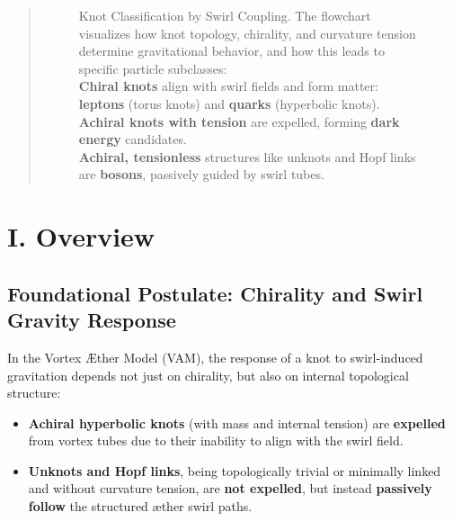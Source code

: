 \documentclass[12pt]{article}
\begin{document}
\begin{abstract}
\begin{figure}[H]
{
            }
            \caption{Knot Classification by Swirl Coupling.
                The flowchart visualizes how knot topology, chirality, and curvature tension determine gravitational behavior, and how this leads to specific particle subclasses:
                    \\ \textbf{Chiral knots} align with swirl fields and form matter: \textbf{leptons} (torus knots) and \textbf{quarks} (hyperbolic knots).
                    \\ \textbf{Achiral knots with tension} are expelled, forming \textbf{dark energy} candidates.
                    \\ \textbf{Achiral, tensionless} structures like unknots and Hopf links are \textbf{bosons}, passively guided by swirl tubes.
            }
        \end{figure}

  \end{abstract}

  \titlepageClose
\fi


\section*{\papertitle}



\section*{I. Overview}

\subsection*{Foundational Postulate: Chirality and Swirl Gravity Response}
In the Vortex Æther Model (VAM), the response of a knot to swirl-induced gravitation depends not just on chirality, but also on internal topological structure:

\begin{itemize}
    \item \textbf{Achiral hyperbolic knots} (with mass and internal tension) are \textbf{expelled} from vortex tubes due to their inability to align with the swirl field.
    \item \textbf{Unknots and Hopf links}, being topologically trivial or minimally linked and without curvature tension, are \textbf{not expelled}, but instead \textbf{passively follow} the structured æther swirl paths.
\end{itemize}
\end{document}
